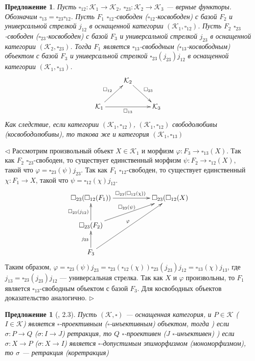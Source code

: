 \documentclass[12pt]{article}
\newtheorem{proposition}[theorem]{Предложение}
\newenvironment{proof}{\par $\triangleleft$}{$\triangleright$}
\begin{document}
\begin{proposition}\label{PrCompOfFrIsFr} 
Пусть $\square_{12}:\mathcal{K}_1\to\mathcal{K}_2$, $\square_{23}:\mathcal{K}_2\to\mathcal{K}_3$ --- верные функторы. Обозначим $\square_{13}=\square_{23}\square_{12}$. Пусть 
$F_1$ $\square_{12}$-свободен ($\square_{12}$-косвободен) с базой $F_2$ и универсальной стрелкой $j_{12}$ в оснащенной категории $(\mathcal{K}_1,\square_{12})$. Пусть $F_2$ $\square_{23}$-свободен 
($\square_{23}$-косвободен) с базой $F_3$ и универсальной стрелкой $j_{23}$ в оснащенной категории $(\mathcal{K}_2,\square_{23})$. Тогда $F_1$ является $\square_{13}$-свободным ($\square_{13}$-косвободным) 
объектом с базой $F_3$ и универсальной стрелкой $\square_{23}(j_{23})j_{12}$ в оснащенной категории $(\mathcal{K}_1,\square_{13})$. 
$$
\xymatrix{
& { \mathcal{K}_2} \ar[dr]^{\square_{23}} & \\
{\mathcal{K}_1} \ar[ur]^{\square_{12}} \ar[rr]_{\square_{13}} & & {\mathcal{K}_3}}
$$
Как следствие, если категории $(\mathcal{K}_1,\square_{12})$, $(\mathcal{K}_1,\square_{12})$ свободолюбивы (косвободолюбивы), то такова же и категория $(\mathcal{K}_1,\square_{13})$ 
\end{proposition}
\begin{proof}
Рассмотрим произвольный объект $X\in\mathcal{K}_1$ и морфизм $\varphi:F_3\to \square_{13}(X)$. Так как $F_2$ $\square_{23}$-свободен, то существует единственный морфизм $\psi:F_2\to \square_{12}(X)$, 
такой что $\varphi=\square_{23}(\psi)j_{23}$. Так как $F_1$ $\square_{12}$-свободен, то существует единственный $\chi:F_1\to X$, такой что $\psi=\square_{12}(\chi)j_{12}$.
$$
\xymatrix
{
{\square_{23}(\square_{12}(F_1)}) \ar[rr]^{\square_{23}(\square_{12}(\chi))}& & {\square_{23}(\square_{12}(X)}\\
{\square_{23}(F_2)} \ar[u]^{\square_{23}(j_{12})} \ar[urr]^{\square_{23}(\psi)} & &\\
{F_3} \ar[u]^{j_{23}} \ar[uurr]^{\varphi} & \\
} 
$$
Таким образом, $\varphi=\square_{23}(\psi)j_{23}=\square_{23}(\square_{12}(\chi))\square_{23}(j_{23})j_{12}=\square_{13}(\chi) j_{13}$, где $j_{13}=\square_{23}(j_{23})j_{12}$ --- универсальная стрелка. 
Так как $X$ и $\varphi$ произвольны, то $F_1$ является $\square_{13}$-свободным объектом с базой $F_3$. Для косвободных объектов доказательство аналогично.
\end{proof}

\begin{proposition}[\cite{HelMetrFrQmod}, 2.3]\label{PrRetractsProjInj} Пусть $(\mathcal{K},\square)$ --- оснащенная категория, и $P\in\mathcal{K}$ ($I\in\mathcal{K}$) является 
$\square$-проективным ($\square$-инъективным) объектом, тогда
) если $\sigma:P\to Q$ ($\sigma:I\to J$) ретракция, то $Q$ $\square$-проективен ($J$ $\square$-инъективен)
) если $\sigma:X\to P$ ($\sigma:X\to I$) является $\square$-допустимым эпиморфизмом (мономорфизмом), то $\sigma$ --- ретракция (коретракция)
\end{proposition}
\end{document}

